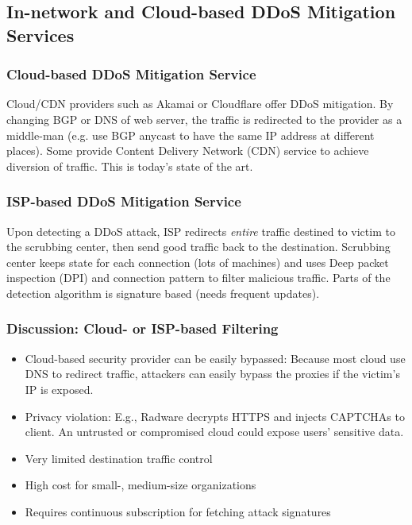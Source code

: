 \subsection{In-network and Cloud-based DDoS	Mitigation Services}

\subsubsection{Cloud-based DDoS Mitigation Service}
Cloud/CDN providers such as Akamai or Cloudflare offer DDoS mitigation. By changing BGP or DNS of web server, the traffic is redirected to the provider as a middle-man (e.g. use BGP anycast to have the same IP address at different places). Some provide Content Delivery Network (CDN) service to achieve diversion of traffic. This is today's state of the art.

\subsubsection{ISP-based DDoS Mitigation Service}
Upon detecting a DDoS attack, ISP redirects \textit{entire} traffic destined to victim to the scrubbing center, then send good traffic back to the destination. Scrubbing center keeps state for each connection (lots of machines) and uses Deep packet inspection (DPI) and connection pattern to filter malicious traffic. Parts of the detection algorithm is signature based (needs frequent updates).

\subsubsection{Discussion: Cloud- or ISP-based Filtering}
\begin{itemize}
	\item Cloud-based security provider can be easily bypassed: Because most cloud use DNS to redirect traffic, attackers can easily bypass the proxies if the victim’s IP is exposed.
	\item Privacy violation: E.g., Radware decrypts HTTPS and injects CAPTCHAs to client. An untrusted or compromised cloud could expose users’ sensitive data.
	\item Very limited destination traffic control
	\item High cost for small-, medium-size organizations
	\item Requires continuous subscription for fetching attack signatures
\end{itemize}

